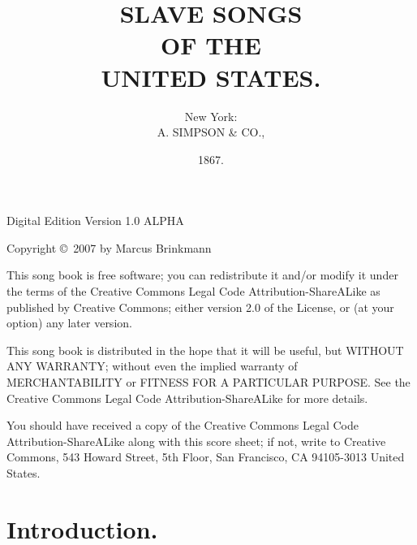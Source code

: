 \documentclass[a5paper,10pt]{book}
\begin{document}
\renewcommand \thesection {\arabic{section}.}

\newcommand \go {\large}



\title{{\Huge SLAVE SONGS}\\
\bigskip
{\small OF THE}\\
\bigskip
{\huge UNITED STATES.}}

\author{{\go New York:}\\A. SIMPSON \& CO.,}

\date{1867.}

\maketitle

\vfill

Digital Edition Version 1.0 ALPHA

Copyright \copyright\ 2007 by Marcus Brinkmann

This song book is free software; you can redistribute it and/or modify
it under the terms of the Creative Commons Legal Code
Attribution-ShareALike as published by Creative Commons; either
version 2.0 of the License, or (at your option) any later version.

This song book is distributed in the hope that it will be useful, but
WITHOUT ANY WARRANTY; without even the implied warranty of
MERCHANTABILITY or FITNESS FOR A PARTICULAR PURPOSE.  See the Creative
Commons Legal Code Attribution-ShareALike for more details.

You should have received a copy of the Creative Commons Legal Code
Attribution-ShareALike along with this score sheet; if not, write to
Creative Commons, 543 Howard Street, 5th Floor, San Francisco, CA
94105-3013 United States.

\tableofcontents

\chapter{Introduction.}

\end{document}
